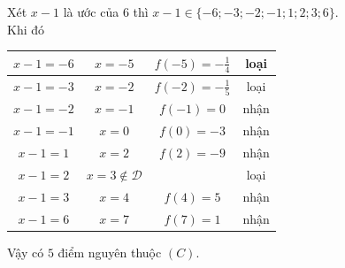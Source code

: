 \begin{ex}
{\begin{itemchoice}
			Xét $x-1$ là ước của $6$ thì $x-1 \in \{-6; -3; -2;-1; 1;2;3;6\}$.\\ Khi đó
			\begin{center}
				\begin{tabular}{|c|c|c|c|}
					\hline
					$x-1 = -6$	& $x=-5$ & $f(-5)=-\frac{1}{4}$ & loại \\
					\hline
					$x-1 = -3$	& $x=-2$ & $f(-2)=-\frac{1}{5}$ & loại \\
					\hline
					$x-1 = -2$	& $x=-1$ & $f(-1)=0$ & nhận \\
					\hline
					$x-1 = -1$	& $x=0$ & $f(0)=-3$ & nhận \\
					\hline
					$x-1 = 1$	& $x=2$ & $f(2)=-9$ & nhận \\
					\hline
					$x-1 = 2$	& $x=3\notin \mathscr{D}$ & & loại \\
					\hline
					$x-1 = 3$	& $x=4$ & $f(4)=5$ & nhận \\
					\hline
					$x-1 = 6$	& $x=7$ & $f(7)=1$ & nhận \\
					\hline
				\end{tabular}
			\end{center}
			Vậy có $5$ điểm nguyên thuộc $(C)$.
		\end{itemchoice}
	}
\end{ex}

